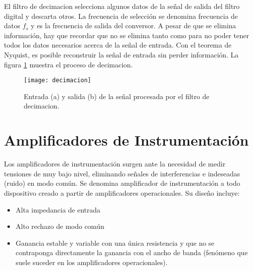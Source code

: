 El filtro de decimacion selecciona algunos datos de la señal de salida del filtro digital y descarta otros. La frecuencia de selección se denomina frecuencia de datos $f_s$ y es la frecuencia de salida del conversor. A pesar de que se elimina información, hay que recordar que no se elimina tanto como para no poder tener todos los datos necesarios acerca de la señal de entrada. Con el teorema de Nyquist\cite{shannon}, es posible reconstruir la señal de entrada sin perder información. La figura \ref{fig:decimacion} muestra el proceso de decimacion.\cite{delta_sigma_2} %

\begin{figure}[h]
  \centering
  \texttt{[image: decimacion]}
  \caption{Entrada (a) y salida (b) de la señal procesada por el filtro de decimacion. }\label{fig:decimacion}
\end{figure} 




\section{Amplificadores de Instrumentación} %
\label{sec:amplificadores_de_instrumentacion}


Los amplificadores de instrumentación surgen ante la necesidad de medir tensiones de muy bajo nivel, eliminando señales de interferencias e indeseadas (ruido) en modo común.
Se denomina amplificador de instrumentación a todo dispositivo creado a partir de amplificadores operacionales. Su diseño incluye:

\begin{itemize}
	\item Alta impedancia de entrada
    \item Alto rechazo de modo común
    \item Ganancia estable y variable con una única resistencia y que no se contraponga directamente la ganancia con el ancho de banda (fenómeno que suele suceder en los amplificadores operacionales).
\end{itemize}

